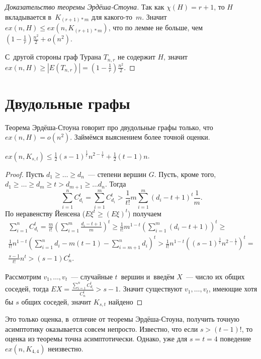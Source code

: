 \documentclass{article}
\begin{document}
\begin{proof}[Доказательство теоремы Эрдёша-Стоуна]
	Так как $\chi(H) = r + 1$, то $H$ вкладывается в~$K_{(r+1) \ast m}$ для
	какого-то~$m$. Значит $ex(n, H) \le ex(n, K_{(r+1) \ast m})$, что по лемме не
	больше, чем $(1 - \frac{1}{r}) \frac{n^2}{2} + o(n^2)$.

	С~другой стороны граф Турана $T_{n,r}$ не содержит $H$, значит $ex(n, H) \ge
	|E(T_{n,r})| = (1 - \frac{1}{r})\frac{n^2}{2}$.
\end{proof}

\section{Двудольные графы}

Теорема Эрдёша-Стоуна говорит про двудольные графы только, что $ex(n, H) =
o(n^2)$. Займёмся выяснением более точной оценки.

\begin{theorem}
	$ex(n, K_{s,t}) \le \frac{1}{2} (s - 1)^{\frac{1}{t}} n^{2-\frac{1}{t}} +
	\frac{1}{2}(t-1)n$.
\end{theorem}
\begin{proof}
	Пусть $d_1 \ge \ldots \ge d_n$~--- степени вершин $G$. Пусть, кроме того,
	$d_1 \ge \ldots \ge d_m \ge t > d_{m+1} \ge \ldots d_n$. Тогда
	$$\sum\limits_{i=1}^n C_{d_i}^t = \sum\limits_{i=1}^m C_{d_i}^t > \frac{1}{t!}
	m \sum\limits_{i=1}^m (d_i - t + 1)^t \frac{1}{m}.$$
	По неравенству Йенсена ($E\xi^t \ge (E\xi)^t$) получаем
	\begin{multline*}
		\sum\limits_{i=1}^n C_{d_i}^t = \frac{m}{t!} \left(\sum\limits_{i=1}^m
		\frac{d_i	- t + 1}{m}\right)^t \ge \frac{1}{t!} m^{1-t} \left(
		\sum\limits_{i=1}^m (d_i - t + 1)\right)^t \ge\\
		\frac{1}{t!} n^{1-t} \left( \sum_{i=1}^n d_i - m(t-1) - \sum_{i=m+1}^n
		d_i\right)^t > \frac{1}{t!} n^{1-t} \left((s-1)^{\frac{1}{t}}
		n^{2-\frac{1}{t}}\right)^t =\\
		\frac{s - 1}{t!} n^t > (s - 1) C_n^t.
	\end{multline*}

	Рассмотрим $v_1, \ldots, v_t$~--- случайные $t$~вершин и~введём $X$~--- число
	их общих соседей, тогда $EX = \frac{\sum\limits_{i=1}^n C_{d_i}^t}{C_n^t} >
	s - 1$. Значит существуют $v_1, \ldots, v_t$, имеющие хотя бы $s$ общих
	соседей, значит $K_{s,t}$ найдено
\end{proof}

Это только оценка, в~отличие от теоремы Эрдёша-Стоуна, получить точную
асимптотику оказывается совсем непросто. Известно, что если $s > (t - 1)!$, то
оценка из теоремы точна асимптотически. Однако, уже для $s = t = 4$ поведение
$ex(n, K_{4,4})$ неизвестно.
\end{document}
